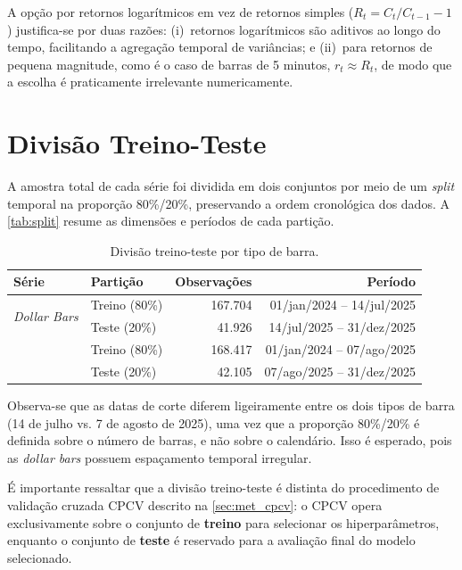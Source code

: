 A opção por retornos logarítmicos em vez de retornos simples
($R_t = C_t/C_{t-1} - 1$) justifica-se por duas razões: (i)~retornos
logarítmicos são aditivos ao longo do tempo, facilitando a agregação
temporal de variâncias; e (ii)~para retornos de pequena magnitude, como é
o caso de barras de 5 minutos, $r_t \approx R_t$, de modo que a escolha é
praticamente irrelevante numericamente.

\section{Divisão Treino-Teste}
\label{sec:met_split}

A amostra total de cada série foi dividida em dois conjuntos por meio de um
\emph{split} temporal na proporção 80\%/20\%, preservando a ordem
cronológica dos dados. A \autoref{tab:split} resume as dimensões e períodos
de cada partição.

\begin{table}[H]
\centering
\caption{Divisão treino-teste por tipo de barra.}
\label{tab:split}
\begin{tabular}{llrr}
\toprule
{Série} & {Partição} & {Observações} & {Período} \\
\midrule
\multirow{2}{*}{\emph{Dollar Bars}}
    & Treino (80\%) & 167.704 & 01/jan/2024 -- 14/jul/2025 \\
    & Teste (20\%)  &  41.926 & 14/jul/2025 -- 31/dez/2025 \\
\addlinespace
\multirow{2}{*}{\emph{Time Bars}}
    & Treino (80\%) & 168.417 & 01/jan/2024 -- 07/ago/2025 \\
    & Teste (20\%)  &  42.105 & 07/ago/2025 -- 31/dez/2025 \\
\bottomrule
\end{tabular}
\end{table}

Observa-se que as datas de corte diferem ligeiramente entre os dois tipos
de barra (14 de julho vs. 7 de agosto de 2025), uma vez que a proporção
80\%/20\% é definida sobre o número de barras, e não sobre o calendário.
Isso é esperado, pois as \emph{dollar bars} possuem espaçamento temporal
irregular.

É importante ressaltar que a divisão treino-teste é distinta do
procedimento de validação cruzada CPCV descrito na
\autoref{sec:met_cpcv}: o CPCV opera exclusivamente sobre o conjunto de
\textbf{treino} para selecionar os hiperparâmetros, enquanto o conjunto de
\textbf{teste} é reservado para a avaliação final do modelo selecionado.

